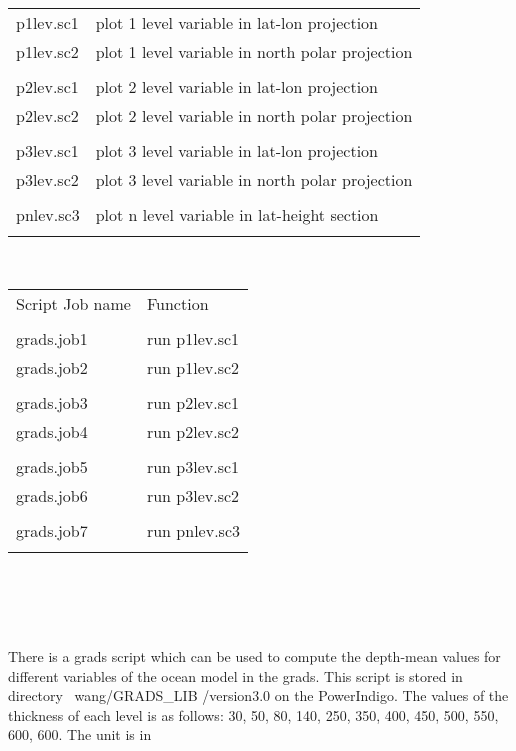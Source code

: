 \begin{tabular}{ll}

p1lev.sc1  &	plot 1 level variable in lat-lon projection      \\
p1lev.sc2  &	plot 1 level variable in north polar projection   \\
\\
p2lev.sc1  &	plot 2 level variable in lat-lon projection      \\
p2lev.sc2  &	plot 2 level variable in north polar projection   \\
\\
p3lev.sc1  &	plot 3 level variable in lat-lon projection      \\
p3lev.sc2  &	plot 3 level variable in north polar projection   \\
\\
pnlev.sc3  &	plot n level variable in lat-height section       \\
\\
\end{tabular}
\\
\begin{tabular}{ll}

Script Job name	&	Function  \\
\\
grads.job1      &	run p1lev.sc1      \\
grads.job2      &	run p1lev.sc2      \\
\\
grads.job3      &	run p2lev.sc1      \\
grads.job4      &	run p2lev.sc2      \\
\\
grads.job5      &	run p3lev.sc1      \\
grads.job6      &	run p3lev.sc2      \\
\\
grads.job7      &	run pnlev.sc3      \\
\\
\end{tabular}
\\
\\
\\
\\
There is a grads script which can be used to compute the depth-mean values for
different variables of the ocean model in the grads. This script is stored in directory ~wang/GRADS\_LIB
/version3.0 on the PowerIndigo. The values of the thickness of each level is as follows:
30, 50, 80, 140, 250, 350, 400, 450, 500, 550, 600, 600. The unit is in
